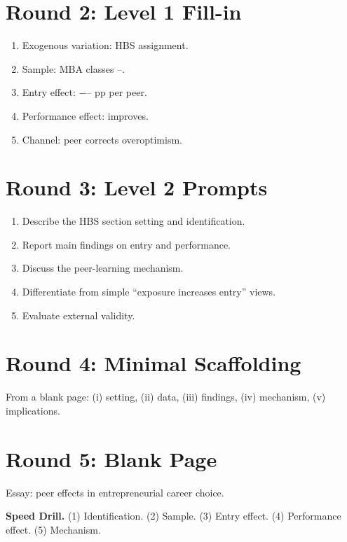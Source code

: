\documentclass[11pt]{article}
\newcommand{\blank}[1]{\underline{\hspace{#1}}}
\begin{document}
\section*{Round 2: Level 1 Fill-in}
\begin{enumerate}
\item Exogenous variation: HBS \blank{2cm} assignment.
\item Sample: MBA classes \blank{1cm}--\blank{1cm}.
\item Entry effect: $-$\blank{1cm}--\blank{1cm} pp per peer.
\item Performance effect: \blank{2cm} improves.
\item Channel: peer \blank{2cm} corrects overoptimism.
\end{enumerate}

\section*{Round 3: Level 2 Prompts}
\begin{enumerate}
\item Describe the HBS section setting and identification.
\item Report main findings on entry and performance.
\item Discuss the peer-learning mechanism.
\item Differentiate from simple ``exposure increases entry'' views.
\item Evaluate external validity.
\end{enumerate}

\section*{Round 4: Minimal Scaffolding}
From a blank page: (i) setting, (ii) data, (iii) findings, (iv) mechanism, (v) implications.

\section*{Round 5: Blank Page}
Essay: peer effects in entrepreneurial career choice.

\vspace{6pt}
\begin{drillbox}
\textbf{Speed Drill.} (1) Identification. (2) Sample. (3) Entry effect. (4) Performance effect. (5) Mechanism.
\end{drillbox}
\end{document}
